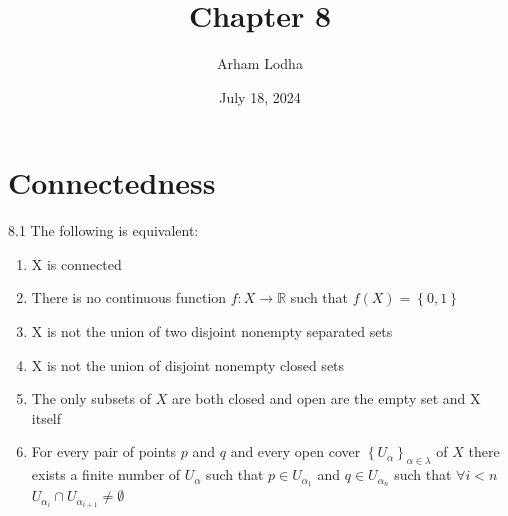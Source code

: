 \documentclass{article}
\newcommand*{\empset}{\emptyset}
\newcommand{\R}{\mathbb{R}}
\begin{document}
\title{Chapter 8}
\author{Arham Lodha}%
\date{July 18, 2024}%
\maketitle

\section{Connectedness}

\begin{claim}{8.1}\label{Claim 8.1.}
    The following is equivalent:

    \begin{enumerate}
        \item X is connected
        \item There is no continuous function $f: X \to \R$ such that $f(X) = \left\{ 0, 1 \right\}$ 
        \item X is not the union of two disjoint nonempty separated sets
        \item X is not the union of disjoint nonempty closed sets
        \item The only subsets of $X$ are both closed and open are the empty set and X itself
        \item For every pair of points $p$ and $q$ and every open cover $\left\{ U_\alpha \right\}_{\alpha \in \lambda}$ of $X$ there exists a finite number of $U_\alpha$ such that $p \in U_{\alpha_1}$ and $q \in U_{\alpha_n}$ such that $\forall i < n$ $U_{\alpha_i} \cap U_{\alpha_{i + 1}} \neq \empset$  
    \end{enumerate}
    
\end{claim}
\end{document}
